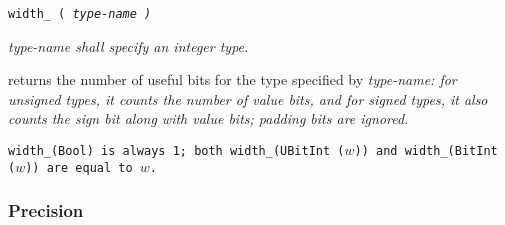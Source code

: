 \def\Subsubsection#1{\subsubsection{#1}}


\tt{width_ (} \it{type-name} \tt{)}


\it{type-name} shall specify an integer type.


 returns the number of useful bits for the type specified by
\it{type-name}: for unsigned types, it counts the number of value bits,
and for signed types, it also counts the sign bit along with value bits;
padding bits are ignored.

\example \tt{width_(Bool)} is always 1; both \tt{width_(UBitInt (}$w$\tt{))}
and \tt{width_(BitInt (}$w$\tt{))} are equal to $w$.

\Subsubsection{Precision}
